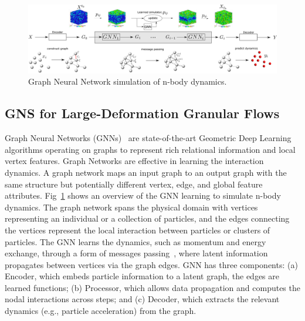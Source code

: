 \documentclass{vgtc}
\begin{document}
\begin{figure}[!t]
    \centering
    \includegraphics[width=\textwidth]{figs/gnn.png}
    \caption{Graph Neural Network simulation of n-body dynamics.}
    \label{fig:gnn}
\end{figure}
\subsection{GNS for Large-Deformation Granular Flows}
Graph Neural Networks (GNNs)~\cite{scarselli2008graph} are state-of-the-art Geometric Deep Learning algorithms operating on graphs to represent rich relational information and local vertex features.  Graph Networks are effective in learning the interaction dynamics.  A graph network maps an input graph to an output graph with the same structure but potentially different vertex, edge, and global feature attributes.  Fig~\ref{fig:gnn} shows an overview of the GNN learning to simulate n-body dynamics.  The graph network spans the physical domain with vertices representing an individual or a collection of particles, and the edges connecting the vertices represent the local interaction between particles or clusters of particles.  The GNN learns the dynamics, such as momentum and energy exchange, through a form of messages passing~\cite{gilmer2017neural}, where latent information propagates between vertices via the graph edges.  GNN has three components: (a) Encoder, which embeds particle information to a latent graph, the edges are learned functions; (b) Processor, which allows data propagation and computes the nodal interactions across steps; and (c) Decoder, which extracts the relevant dynamics (e.g., particle acceleration) from the graph. 
\end{document}

